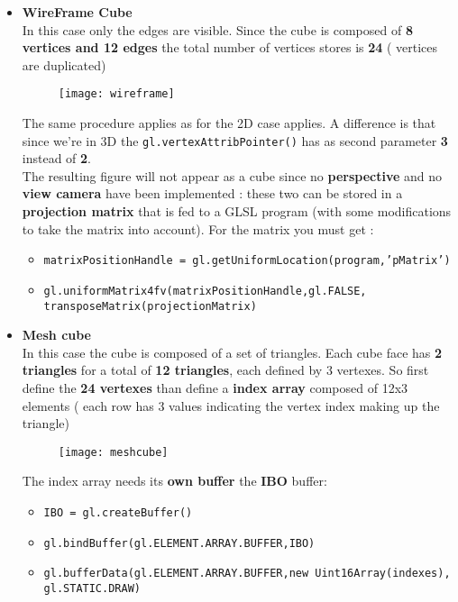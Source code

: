 \begin{itemize}
\item \textbf{WireFrame Cube}\\
In this case only the edges are visible. Since the cube is composed of \textbf{8 vertices and 12 edges} the total number of vertices stores is \textbf{24} ( vertices are duplicated)
 \begin{figure}[H]
 \centering
 \texttt{[image: wireframe]} 
 \end{figure}
The same procedure applies as for the 2D case applies. A difference is that since we're in 3D the \texttt{gl.vertexAttribPointer()} has as second parameter \textbf{3} instead of \textbf{2}.\\
The resulting figure will not appear as a cube since no \textbf{perspective} and no \textbf{view camera} have been implemented : these two can be stored in a \textbf{projection matrix} that is fed to a GLSL program (with some modifications to take the matrix into account). For the matrix you must get :
\begin{itemize}
\item \texttt{matrixPositionHandle = gl.getUniformLocation(program,'pMatrix')}
\item \texttt{gl.uniformMatrix4fv(matrixPositionHandle,gl.FALSE,\\ transposeMatrix(projectionMatrix)}
\end{itemize}
\item \textbf{Mesh cube}\\
In this case the cube is composed of a set of triangles. Each cube face has \textbf{2 triangles} for a total of \textbf{12 triangles}, each defined by 3 vertexes. So first define the \textbf{24 vertexes} than define a \textbf{index array} composed of 12x3 elements ( each row has 3 values indicating the vertex index making up the triangle)
 \begin{figure}[H]
 \centering
 \texttt{[image: meshcube]} 
 \end{figure}
  The index array needs its \textbf{own buffer} the  \textbf{IBO} buffer:
 \begin{itemize}
 \item \texttt{IBO = gl.createBuffer()}
 \item \texttt{gl.bindBuffer(gl.ELEMENT.ARRAY.BUFFER,IBO)}
 \item \texttt{gl.bufferData(gl.ELEMENT.ARRAY.BUFFER,new Uint16Array(indexes),\\gl.STATIC.DRAW)}
 \end{itemize}

\end{itemize}
